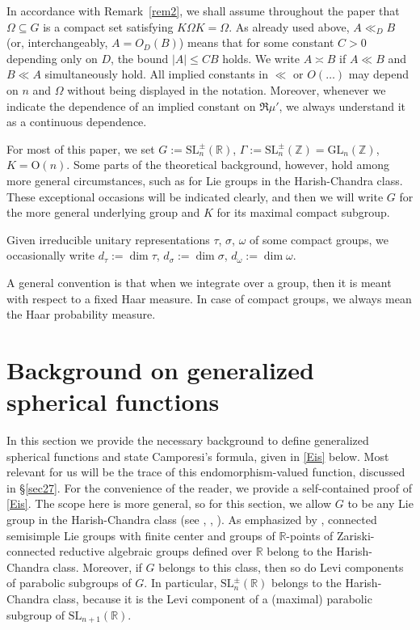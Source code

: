 \documentclass[11pt,oneside]{amsart}
\numberwithin{equation}{section}
\theoremstyle{remark}
\theoremstyle{plain}
\newcommand\GL{\mathrm{GL}}
\newcommand\SL{\mathrm{SL}}
\newcommand\OO{\mathrm{O}}
\newcommand\ZZ{\mathbb{Z}}
\newcommand\RR{\mathbb{R}}
\renewcommand\leq{\leqslant}
\begin{document}
In accordance with Remark~\ref{rem2}, we shall assume throughout the paper that $\Omega\subseteq G$ is a compact set satisfying $K\Omega K=\Omega$. As already used above, $A\ll_D B$ (or, interchangeably, $A=O_D(B)$) means that for some constant $C>0$ depending only on $D$, the bound $|A|\leq CB$ holds. We write $A\asymp B$ if $A\ll B$ and $B\ll A$ simultaneously hold. All implied constants in $\ll$ or $O(\dotsc)$ may depend on $n$ and $\Omega$ without being displayed in the notation. Moreover, whenever we indicate the dependence of an implied constant on $\Re\mu'$, we always understand it as a continuous dependence.

For most of this paper, we set $G:=\SL_n^{\pm}(\RR)$, $\Gamma:=\SL_n^{\pm}(\ZZ)=\GL_n(\ZZ)$, $K=\OO(n)$. Some parts of the theoretical background, however, hold among more general circumstances, such as for Lie groups in the Harish-Chandra class. These exceptional occasions will be indicated clearly, and then we will write $G$ for the more general underlying group and $K$ for its maximal compact subgroup. 

Given irreducible unitary representations $\tau$, $\sigma$, $\omega$ of some compact groups, we occasionally write $d_{\tau}:=\dim\tau$, $d_{\sigma}:=\dim\sigma$, $d_{\omega}:=\dim \omega$.

A general convention is that when we integrate over a group, then it is meant with respect to a fixed Haar measure. In case of compact groups, we always mean the Haar probability measure.

\section{Background on generalized spherical functions}\label{spherical}
In this section we provide the necessary background to define generalized spherical functions and state Camporesi's formula, given in \eqref{Eis} below. Most relevant for us will be the trace of this endomorphism-valued function, discussed in \S\ref{sec27}. For the convenience of the reader, we provide a self-contained proof of \eqref{Eis}. The scope here is more general, so for this section, we allow $G$ to be any Lie group in the Harish-Chandra class (see \cite[\S3]{HC1}, \cite[\S1]{CM}, \cite[Ch.~4, \S3]{KV}). As emphasized by \cite[\S1]{CM}, connected semisimple Lie groups with finite center and groups of $\RR$-points of Zariski-connected reductive algebraic groups defined over $\RR$ belong to the Harish-Chandra class. Moreover, if $G$ belongs to this class, then so do Levi components of parabolic subgroups of $G$. In particular, $\SL_n^\pm(\RR)$ belongs to the Harish-Chandra class, because it is the Levi component of a (maximal) parabolic subgroup of $\SL_{n+1}(\RR)$.
\end{document}
